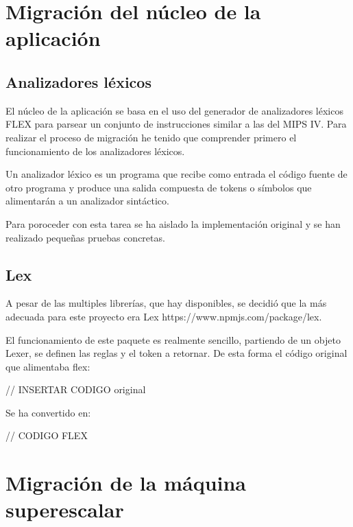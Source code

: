 

\section{Migración del núcleo de la aplicación}
\label{5:sec1} 

\subsection{Analizadores léxicos}
El núcleo de la aplicación se basa en el uso del generador de analizadores 
léxicos FLEX para parsear un conjunto de instrucciones similar a las del MIPS IV. 
Para realizar el proceso de migración he tenido que comprender primero el 
funcionamiento de los analizadores léxicos.

\bigskip
Un analizador léxico es un programa que recibe como entrada el código fuente de 
otro programa y produce una salida compuesta de tokens o símbolos 
que alimentarán a un analizador sintáctico.

\bigskip
Para poroceder con esta tarea se ha aislado la implementación original y se han 
realizado pequeñas pruebas concretas.

\subsection{Lex}

A pesar de las multiples librerías, que hay disponibles, se decidió que la más adecuada 
para este proyecto era Lex https://www.npmjs.com/package/lex. 

El funcionamiento de este paquete es realmente sencillo, partiendo de un 
objeto Lexer, se definen las reglas y el token a retornar. De esta forma
el código original que alimentaba flex:

// INSERTAR CODIGO original

Se ha convertido en: 

// CODIGO FLEX

\section{Migración de la máquina superescalar}
\label{5:sec2} 

